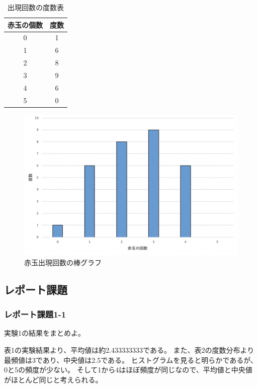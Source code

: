 \documentclass[12pt]{jarticle}
\begin{document}
\begin{table}
    \begin{center}
        \caption{出現回数の度数表}
        \begin{tabular}[h]{|c|c|}
            \hline
            赤玉の個数 & 度数 \\
            \hline
            0          & 1    \\
            1          & 6    \\
            2          & 8    \\
            3          & 9    \\
            4          & 6    \\
            5          & 0    \\
            \hline
        \end{tabular}
    \end{center}
\end{table}
\begin{figure}[h]
    \begin{center}
        \includegraphics[scale=0.9]{kadai4_1graph1.png}
    \end{center}
    \caption{赤玉出現回数の棒グラフ}
\end{figure}
\clearpage

\subsection{レポート課題}
\subsubsection*{レポート課題1-1}
\begin{shadebox}
    実験1の結果をまとめよ。
\end{shadebox}
表1の実験結果より、平均値は約2.433333333である。
また、表2の度数分布より最頻値は3であり、中央値は2.5である。
ヒストグラムを見ると明らかであるが、0と5の頻度が少ない。
そして1から4はほぼ頻度が同じなので、平均値と中央値がほとんど同じと考えられる。
\end{document}
